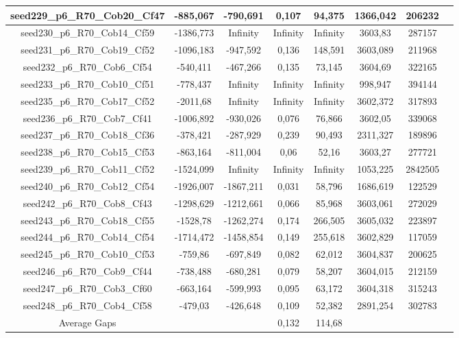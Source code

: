 \documentclass[a4paper]{article}
\begin{document}
\begin{center}
\begin{longtable}{cccccccc}
seed229\_p6\_R70\_Cob20\_Cf47 & -885,067 & -790,691 & 0,107 & 94,375 & 1366,042 & 206232\\
\hline
seed230\_p6\_R70\_Cob14\_Cf59 & -1386,773 & Infinity & Infinity & Infinity & 3603,83 & 287157\\
\hline
seed231\_p6\_R70\_Cob19\_Cf52 & -1096,183 & -947,592 & 0,136 & 148,591 & 3603,089 & 211968\\
\hline
seed232\_p6\_R70\_Cob6\_Cf54 & -540,411 & -467,266 & 0,135 & 73,145 & 3604,69 & 322165\\
\hline
seed233\_p6\_R70\_Cob10\_Cf51 & -778,437 & Infinity & Infinity & Infinity & 998,947 & 394144\\
\hline
seed235\_p6\_R70\_Cob17\_Cf52 & -2011,68 & Infinity & Infinity & Infinity & 3602,372 & 317893\\
\hline
seed236\_p6\_R70\_Cob7\_Cf41 & -1006,892 & -930,026 & 0,076 & 76,866 & 3602,05 & 339068\\
\hline
seed237\_p6\_R70\_Cob18\_Cf36 & -378,421 & -287,929 & 0,239 & 90,493 & 2311,327 & 189896\\
\hline
seed238\_p6\_R70\_Cob15\_Cf53 & -863,164 & -811,004 & 0,06 & 52,16 & 3603,27 & 277721\\
\hline
seed239\_p6\_R70\_Cob11\_Cf52 & -1524,099 & Infinity & Infinity & Infinity & 1053,225 & 2842505\\
\hline
seed240\_p6\_R70\_Cob12\_Cf54 & -1926,007 & -1867,211 & 0,031 & 58,796 & 1686,619 & 122529\\
\hline
seed242\_p6\_R70\_Cob8\_Cf43 & -1298,629 & -1212,661 & 0,066 & 85,968 & 3603,061 & 272029\\
\hline
seed243\_p6\_R70\_Cob18\_Cf55 & -1528,78 & -1262,274 & 0,174 & 266,505 & 3605,032 & 223897\\
\hline
seed244\_p6\_R70\_Cob14\_Cf54 & -1714,472 & -1458,854 & 0,149 & 255,618 & 3602,829 & 117059\\
\hline
seed245\_p6\_R70\_Cob10\_Cf53 & -759,86 & -697,849 & 0,082 & 62,012 & 3604,837 & 200625\\
\hline
seed246\_p6\_R70\_Cob9\_Cf44 & -738,488 & -680,281 & 0,079 & 58,207 & 3604,015 & 212159\\
\hline
seed247\_p6\_R70\_Cob3\_Cf60 & -663,164 & -599,993 & 0,095 & 63,172 & 3604,318 & 315243\\
\hline
seed248\_p6\_R70\_Cob4\_Cf58 & -479,03 & -426,648 & 0,109 & 52,382 & 2891,254 & 302783\\
\hline
\hline
Average Gaps & & & 0,132 & 114,68 & & \\
\hline
\hline
\end{longtable}
\end{center}
\end{document}
